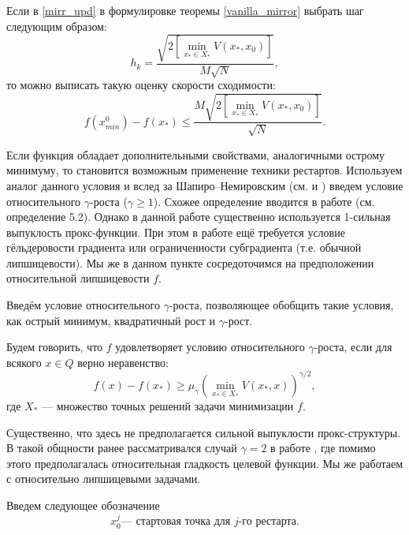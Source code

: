     \begin{remark}
        Если в \eqref{mirr_upd} в формулировке теоремы \ref{vanilla_mirror} выбрать шаг следующим образом:
        \begin{equation} \label{mirr_step}
            h_{k} = \frac{\sqrt{2 \left[\min\limits_{x_* \in X_*}{V(x_*, x_0)}\right] }}{M\sqrt{N}},
        \end{equation}
        то можно выписать такую оценку скорости сходимости:
        \begin{equation} \label{mirr_est}
            f(x_{min}^0) - f(x_*) \leq \frac{M\sqrt{2 \left[\min\limits_{x_* \in X_*}{V(x_*, x_0)}\right]}}{\sqrt{N}}.
        \end{equation}
    \end{remark}
    Если функция обладает дополнительными свойствами, аналогичными острому минимуму,  то становится возможным применение техники рестартов. Используем аналог данного условия и вслед за Шапиро–Немировским (см. \cite{shapiro_2005} и \cite{shapiro_2021} ) введем условие относительного $\gamma$-роста ($\gamma \geq 1$). Схожее определение вводится в работе \cite{sharp_rest} (см. определение 5.2). Однако в данной работе существенно используется 1-сильная выпуклость прокс-функции. При этом в работе \cite{sharp_rest} ещё требуется условие гёльдеровости градиента или ограниченности субградиента (т.е. обычной липшицевости). Мы же в данном пункте сосредоточимся на предположении относительной липшицевости $f$. 
    
    Введём условие относительного $\gamma$-роста, позволяющее обобщить  такие условия, как острый минимум, квадратичный рост и $\gamma$-рост.
    \begin{definition}
       Будем говорить, что $f$ удовлетворяет условию относительного $\gamma$-роста, если для всякого $x \in Q$ верно неравенство:
       \begin{equation} \label{gamma-growth}
           f(x) - f(x_*) \geq \mu_{\gamma}\left(\min_{x_* \in X_*}{V(x_*,x)}\right)^{\gamma/2},
       \end{equation}
       где $X_*$ --- множество точных решений задачи минимизации $f$. 
    \end{definition}
    Существенно, что здесь не предполагается сильной выпуклости прокс-структуры. В такой общности ранее 
    рассматривался случай $\gamma = 2$ в работе \cite{gamma2}, где помимо этого предполагалась относительная гладкость целевой функции. Мы же работаем с относительно липшицевыми задачами.

    Введем следующее обозначение
    \[
        x_0^j \text{--- стартовая точка для } j\text{-го рестарта}.
    \]
    
